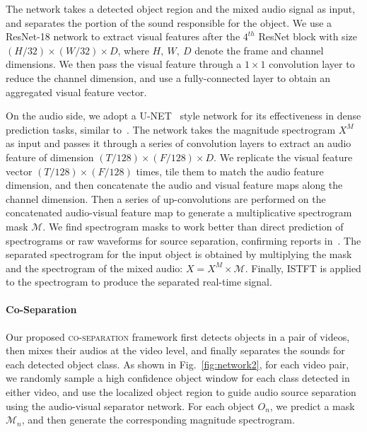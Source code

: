\documentclass[10pt,twocolumn,letterpaper]{article}
\begin{document}
The network takes a detected object region and the mixed audio signal as input, and separates the portion of the sound responsible for the object. We use a ResNet-18 network to extract visual features after the $4^{th}$ ResNet block with size $(H/32) \times (W/32) \times D$, where $H,~W,~D$ denote the frame and channel dimensions. We then pass the visual feature through a $1 \times 1$ convolution layer to reduce the channel dimension, and use a fully-connected layer to obtain an aggregated visual feature vector.

On the audio side, we adopt a U-NET~\cite{ronneberger2015u} style network for its effectiveness in dense prediction tasks, similar to~\cite{zhao2018sound,owens2018audio,gao2019visualsound}. The network takes the magnitude spectrogram $X^M$ as input and passes it through a series of convolution layers to extract an audio feature of dimension $(T/128) \times (F/128) \times D$. We replicate the visual feature vector $(T/128) \times (F/128)$ times, tile them to match the audio feature dimension, and then concatenate the audio and visual feature maps along the channel dimension. Then a series of up-convolutions are performed on the concatenated audio-visual feature map to generate a multiplicative spectrogram mask $\mathcal{M}$. We find spectrogram masks to work better than direct prediction of spectrograms or raw waveforms for source separation, confirming reports in~\cite{wang2018supervised,ephrat2018looking,gao2019visualsound}. The separated spectrogram for the input object is obtained by multiplying the mask and the spectrogram of the mixed audio:  $ X = X^M \times \mathcal{M}$. Finally, ISTFT is applied to the spectrogram to produce the separated real-time signal. 

\vspace*{-0.2in}
\paragraph{Co-Separation}
Our proposed \textsc{co-separation} framework first detects objects in a pair of videos, then mixes their audios at the video level, and finally separates the sounds for each detected object class. As shown in Fig.~\ref{fig:network2}, for each video pair, we randomly sample a high confidence object window for each class detected in either video, and use the localized object region to guide audio source separation using the audio-visual separator network. For each object $O_n$, we predict a mask $\mathcal{M}_n$, and then generate the corresponding magnitude spectrogram. 
\end{document}
